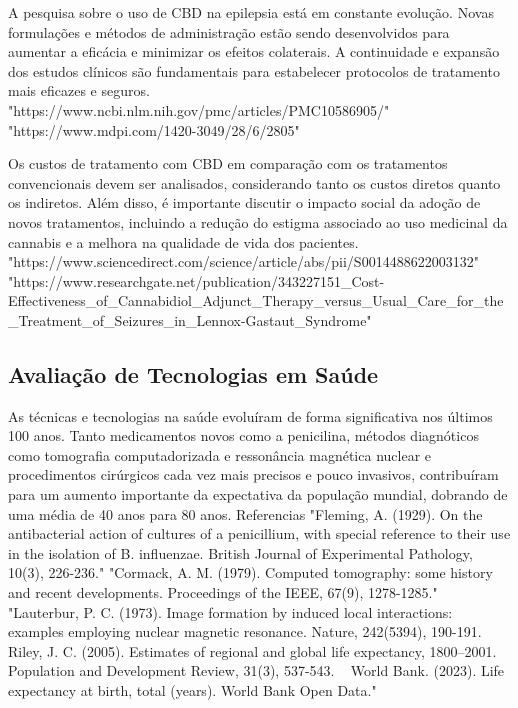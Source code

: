 \documentclass[article,a4paper,12pt,brazil,sumario=tradicional]{abntex2}
\begin{document}
A pesquisa sobre o uso de CBD na epilepsia está em constante evolução. Novas formulações e métodos de administração estão sendo desenvolvidos para aumentar a eficácia e minimizar os efeitos colaterais. A continuidade e expansão dos estudos clínicos são fundamentais para estabelecer protocolos de tratamento mais eficazes e seguros.
"https://www.ncbi.nlm.nih.gov/pmc/articles/PMC10586905/"
"https://www.mdpi.com/1420-3049/28/6/2805"

Os custos de tratamento com CBD em comparação com os tratamentos convencionais devem ser analisados, considerando tanto os custos diretos quanto os indiretos. Além disso, é importante discutir o impacto social da adoção de novos tratamentos, incluindo a redução do estigma associado ao uso medicinal da cannabis e a melhora na qualidade de vida dos pacientes. 
"https://www.sciencedirect.com/science/article/abs/pii/S0014488622003132"
"https://www.researchgate.net/publication/343227151_Cost-Effectiveness_of_Cannabidiol_Adjunct_Therapy_versus_Usual_Care_for_the_Treatment_of_Seizures_in_Lennox-Gastaut_Syndrome"

\subsection{Avaliação de Tecnologias em Saúde}

As técnicas e tecnologias na saúde evoluíram de forma significativa nos últimos 100 anos. Tanto medicamentos novos como a penicilina, métodos diagnóticos como tomografia computadorizada e ressonância magnética nuclear e procedimentos cirúrgicos cada vez mais precisos e pouco invasivos, contribuíram para um aumento importante da expectativa da população mundial, dobrando de uma média de 40 anos para 80 anos. 
Referencias
"Fleming, A. (1929). On the antibacterial action of cultures of a penicillium, with special reference to 
their use in the isolation of B. influenzae. British Journal of Experimental Pathology, 10(3), 226-236."
"Cormack, A. M. (1979). Computed tomography: some history and recent developments. Proceedings of the IEEE, 67(9), 1278-1285."
"Lauterbur, P. C. (1973). Image formation by induced local interactions: examples employing nuclear magnetic resonance. Nature, 242(5394), 190-191.   
Riley, J. C. (2005). Estimates of regional and global life expectancy, 1800–2001. Population and Development Review, 31(3), 537-543.   
World Bank. (2023). Life expectancy at birth, total (years). World Bank Open Data."
\end{document}
